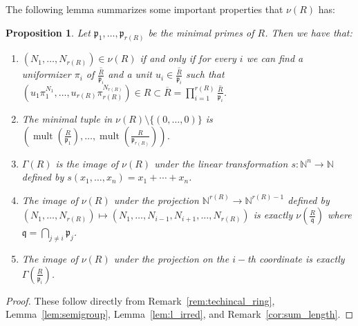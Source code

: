 \documentclass{article}
\newtheorem{proposition}[theorem]{Proposition}
\DeclareMathOperator{\mult}{mult}
\numberwithin{theorem}{section}
\begin{document}
The following lemma summarizes some important properties that $\nu(R)$ has:

\begin{proposition}\label{prop:nu_beasic_prop}
    Let $\mathfrak{p}_1, \dots, \mathfrak{p}_{r(R)}$ be the minimal primes of $R$. Then we have that:
    \begin{enumerate}
        \item $(N_1, \dots, N_{r(R)}) \in \nu(R)$ if and only if for every $i$ we can find a uniformizer $\pi_i$ of $\overline{\frac{R}{\mathfrak{p}_i}}$ and a unit $u_i \in \overline{\frac{R}{\mathfrak{p}_i}}$ such that $(u_1\pi_1^{N_1}, \dots, u_{r(R)}\pi_{r(R)}^{N_{r(R)}}) \in R \subset \overline{R} = \prod_{i=1}^{r(R)} \overline{\frac{R}{\mathfrak{p}_i}}$.
        \item The minimal tuple in $\nu(R) \setminus \{(0, \dots, 0)\}$ is $\left(\mult\left(\frac{R}{\mathfrak{p}_1}\right), \dots, \mult\left(\frac{R}{\mathfrak{p}_{r(R)}}\right)\right)$. 
        \item $\Gamma(R)$ is the image of $\nu(R)$ under the linear transformation $s \colon \mathbb{N}^n \to \mathbb{N}$ defined by $s(x_1,\dots, x_n)=x_1+\cdots+x_n$.
        \item The image of $\nu(R)$ under the projection $\mathbb{N}^{r(R)} \to \mathbb{N}^{r(R)-1}$ defined by $(N_1, \dots, N_{r(R)}) \mapsto (N_1, \dots, N_{i-1}, N_{i+1}, \dots,  N_{r(R)})$ is exactly $\nu\left(\frac{R}{\mathfrak{q}} \right)$ where $\mathfrak{q}=\bigcap_{j \neq i} \mathfrak{p}_j$. 
        \item The image of $\nu(R)$ under the projection on the $i-$th coordinate is exactly $\Gamma\left(\frac{R}{\mathfrak{p}_i}\right)$. 
    \end{enumerate}
\end{proposition}

\begin{proof}
    These follow directly from Remark~\ref{rem:techincal_ring},  Lemma~\ref{lem:semigroup}, Lemma~\ref{lem:l_irred}, and Remark~\ref{cor:sum_length}. 
\end{proof}
\end{document}
